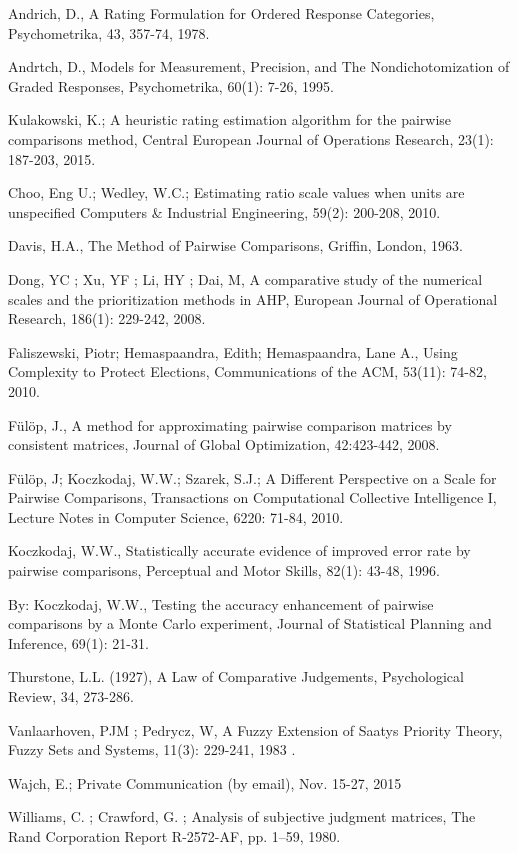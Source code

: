 \documentclass [12pt]{article}
\begin{document}
\begin{thebibliography}{9}

Andrich, D., A Rating Formulation for Ordered Response Categories, Psychometrika, 43, 357-74, 1978.

Andrtch, D.,  Models for Measurement, Precision, and The Nondichotomization of Graded Responses, Psychometrika, 60(1): 7-26, 1995.

Kulakowski, K.;
A heuristic rating estimation algorithm for the pairwise comparisons method,
Central European Journal of Operations Research, 23(1): 187-203, 2015.


Choo, Eng U.; Wedley, W.C.;
Estimating ratio scale values when units are unspecified
Computers \& Industrial Engineering, 59(2): 200-208, 2010.




Davis, H.A., The Method of Pairwise Comparisons, Griffin, London, 1963.

Dong, YC ; Xu, YF ; Li, HY ; Dai, M,
A comparative study of the numerical scales and the prioritization methods in AHP,
European Journal of Operational Research, 186(1): 229-242, 2008.

Faliszewski, Piotr; Hemaspaandra, Edith; Hemaspaandra, Lane A., 
Using Complexity to Protect Elections, 
Communications of the ACM, 53(11): 74-82,  2010.

F\"ul\"op, J., A method for approximating pairwise comparison
matrices by consistent matrices, Journal of Global Optimization,
42:423-442, 2008.

F\"ul\"op, J; Koczkodaj, W.W.; Szarek, S.J.; 
A Different Perspective on a Scale for Pairwise Comparisons,
Transactions on Computational Collective Intelligence I, Lecture Notes in Computer Science, 6220: 71-84, 2010.


Koczkodaj, W.W.,
Statistically accurate evidence of improved error rate by pairwise comparisons,
Perceptual and Motor Skills, 82(1): 43-48, 1996.

By: Koczkodaj, W.W.,
Testing the accuracy enhancement of pairwise comparisons by a Monte Carlo experiment,
Journal of Statistical Planning and Inference, 69(1): 21-31.




Thurstone, L.L. (1927), A Law of Comparative Judgements, Psychological Review, 34, 273-286.

Vanlaarhoven, PJM ; Pedrycz, W, A Fuzzy Extension of Saatys Priority Theory,
Fuzzy Sets and Systems, 11(3): 229-241, 1983 .

Wajch, E.; Private Communication (by email), Nov. 15-27, 2015


Williams, C. ; Crawford, G. ; Analysis of subjective judgment matrices, The Rand Corporation Report R-2572-AF, pp. 1--59, 1980.







\end{thebibliography}
\end{document}
